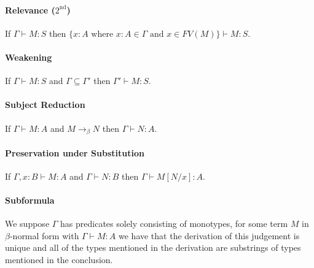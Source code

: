 \paragraph{Relevance ($2^{\text{nd}}$)}
\leavevmode\newline
If $\Gamma \vdash M : S$ then $\{x : A \text{ where }
x : A \in \Gamma \text{ and } x \in FV(M) \} \vdash M : S$.

\paragraph{Weakening}
\leavevmode\newline
If $\Gamma \vdash M : S$ and $\Gamma \subseteq \Gamma'$ then
$\Gamma' \vdash M : S$.

\paragraph{Subject Reduction}
\leavevmode\newline
If $\Gamma \vdash M : A$ and 
$M \to_\beta N$ then $\Gamma \vdash N : A$.

\paragraph{Preservation under Substitution}
\leavevmode\newline
If $\Gamma, x : B \vdash M : A$ and $\Gamma \vdash N : B$
then $\Gamma \vdash M[N / x] : A$.

\paragraph{Subformula}
\leavevmode\newline
We suppose $\Gamma$ has predicates solely consisting of monotypes,
for some term $M$ in $\beta$-normal form with $\Gamma \vdash M : A$
we have that the derivation of this judgement is unique and all
of the types mentioned in the derivation are substrings of types 
mentioned in the conclusion.

